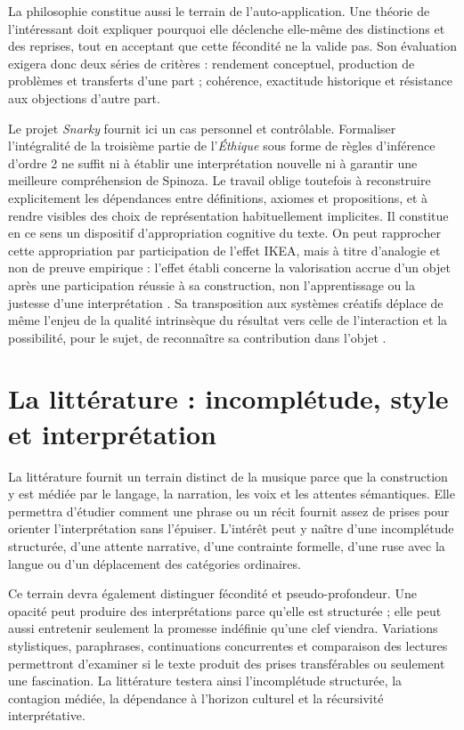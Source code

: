 \documentclass[11pt,a4paper]{article}
\begin{document}
La philosophie constitue aussi le terrain de l'auto-application. Une théorie de
l'intéressant doit expliquer pourquoi elle déclenche elle-même des distinctions
et des reprises, tout en acceptant que cette fécondité ne la valide pas. Son
évaluation exigera donc deux séries de critères : rendement conceptuel,
production de problèmes et transferts d'une part ; cohérence, exactitude
historique et résistance aux objections d'autre part.

Le projet \emph{Snarky} fournit ici un cas personnel et contrôlable. Formaliser
l'intégralité de la troisième partie de l'\emph{Éthique} sous forme de règles
d'inférence d'ordre 2 ne suffit ni à établir une interprétation nouvelle ni à
garantir une meilleure compréhension de Spinoza. Le travail oblige toutefois à
reconstruire explicitement les dépendances entre définitions, axiomes et
propositions, et à rendre visibles des choix de représentation habituellement
implicites. Il constitue en ce sens un dispositif d'appropriation cognitive du
texte. On peut rapprocher cette appropriation par participation de l'effet IKEA,
mais à titre d'analogie et non de preuve empirique : l'effet établi concerne la
valorisation accrue d'un objet après une participation réussie à sa construction,
non l'apprentissage ou la justesse d'une interprétation
\parencite{norton2012ikea}. Sa transposition aux systèmes créatifs déplace de
même l'enjeu de la qualité intrinsèque du résultat vers celle de l'interaction et
la possibilité, pour le sujet, de reconnaître sa contribution dans l'objet
\parencite[152--153]{pachet2026generation}.

\section{La littérature : incomplétude, style et interprétation}

La littérature fournit un terrain distinct de la musique parce que la
construction y est médiée par le langage, la narration, les voix et les attentes
sémantiques. Elle permettra d'étudier comment une phrase ou un récit fournit
assez de prises pour orienter l'interprétation sans l'épuiser. L'intérêt peut y
naître d'une incomplétude structurée, d'une attente narrative, d'une contrainte
formelle, d'une ruse avec la langue ou d'un déplacement des catégories
ordinaires.

Ce terrain devra également distinguer fécondité et pseudo-profondeur. Une
opacité peut produire des interprétations parce qu'elle est structurée ; elle
peut aussi entretenir seulement la promesse indéfinie qu'une clef viendra.
Variations stylistiques, paraphrases, continuations concurrentes et comparaison
des lectures permettront d'examiner si le texte produit des prises
transférables ou seulement une fascination. La littérature testera ainsi
l'incomplétude structurée, la contagion médiée, la dépendance à l'horizon
culturel et la récursivité interprétative.
\end{document}
